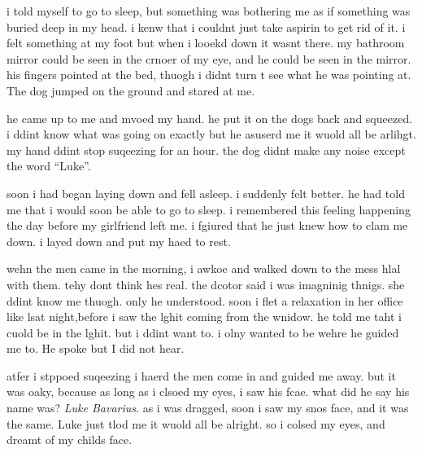 i told myself to go to sleep, but something was bothering me as if
something was buried deep in my head. i kenw that i couldnt just
take aspirin to get rid of it. i felt something at my foot but when
i looekd down it wasnt there. my bathroom mirror could be seen in
the crnoer of my eye, and he could be seen in the mirror. his
fingers pointed at the bed, thuogh i didnt turn t see what he was
pointing at. The dog jumped on the ground and stared at me.



he came up to me and mvoed my hand. he put it on the dogs back and
squeezed. i ddint know what was going on exactly but he asuserd me
it wuold all be arlihgt. my hand ddint stop suqeezing for an hour.
the dog didnt make any noise except the word ``Luke''.



soon i had began laying down and fell asleep. i suddenly felt
better. he had told me that i would soon be able to go to sleep. i
remembered this feeling happening the day before my girlfriend left
me. i fgiured that he just knew how to clam me down. i layed down
and put my haed to rest.



wehn the men came in the morning, i awkoe and walked down to the
mess hlal with them. tehy dont think hes real. the dcotor said i
was imagninig thnigs. she ddint know me thuogh. only he understood.
soon i flet a relaxation in her office like lsat night,before i saw
the lghit coming from the wnidow. he told me taht i cuold be in the
lghit. but i ddint want to. i olny wanted to be wehre he guided me
to. He spoke but I did not hear.



atfer i stppoed suqeezing i haerd the men come in and guided me
away. but it was oaky, because as long as i clsoed my eyes, i saw
his fcae. what did he say his name was? {\em Luke Bavarius}. as i
was dragged, soon i saw my snos face, and it was the same. Luke
just tlod me it wuold all be alright. so i colsed my eyes, and
dreamt of my childs face.



